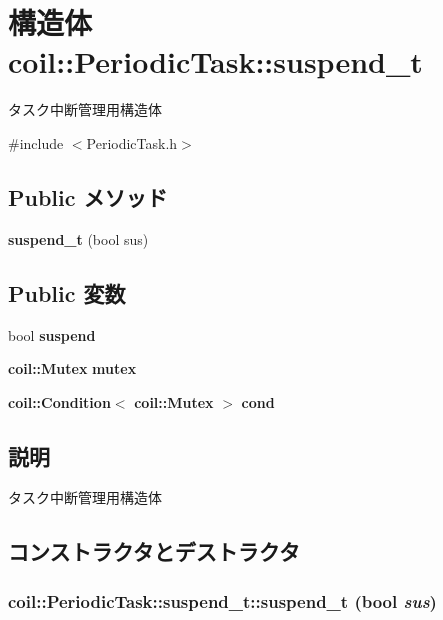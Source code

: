 \section{構造体 coil::PeriodicTask::suspend\_\-t}
\label{structcoil_1_1PeriodicTask_1_1suspend__t}


タスク中断管理用構造体  




{\ttfamily \#include $<$PeriodicTask.h$>$}

\subsection*{Public メソッド}
\begin{DoxyCompactItemize}
\item 
{\bf suspend\_\-t} (bool sus)
\end{DoxyCompactItemize}
\subsection*{Public 変数}
\begin{DoxyCompactItemize}
\item 
bool {\bf suspend}
\item 
{\bf coil::Mutex} {\bf mutex}
\item 
{\bf coil::Condition}$<$ {\bf coil::Mutex} $>$ {\bf cond}
\end{DoxyCompactItemize}


\subsection{説明}
タスク中断管理用構造体 

\subsection{コンストラクタとデストラクタ}
\subsubsection[{suspend\_\-t}]{\setlength{\rightskip}{0pt plus 5cm}coil::PeriodicTask::suspend\_\-t::suspend\_\-t (bool {\em sus})\hspace{0.3cm}{\ttfamily  [inline]}}\label{structcoil_1_1PeriodicTask_1_1suspend__t_ab91a7db9773fff75f5b34de7d2c0580f}


